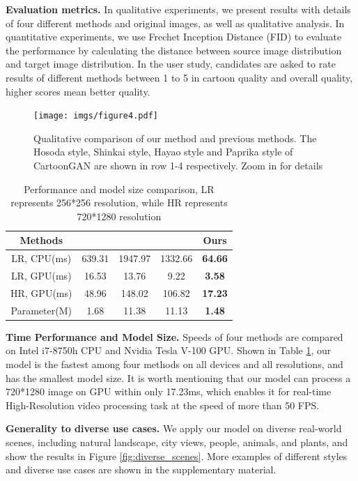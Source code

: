 \documentclass[10pt,twocolumn,letterpaper]{article}
\begin{document}
\textbf{Evaluation metrics.} In qualitative experiments, we present results with details of four different methods and original images, as well as qualitative analysis. In quantitative experiments, we use Frechet Inception Distance (FID) \cite{heusel2017gans} to evaluate the performance by calculating the distance between source image distribution and target image distribution. In the user study, candidates are asked to rate results of different methods between 1 to 5 in cartoon quality and overall quality, higher scores mean better quality.

\begin{figure}[htbp]
\centering
\texttt{[image: imgs/figure4.pdf]}
\caption{Qualitative comparison of our method and previous methods. The Hosoda style, Shinkai style,  Hayao style and Paprika style of CartoonGAN \cite{chen2018cartoongan} are shown in row 1-4 respectively. Zoom in for details}
\label{fig:comparison}
\end{figure}

\begin{table}[t]
\centering
\begin{tabular}{ccccc}
\hline
{Methods}&{\cite{johnson2016perceptual}}&{\cite{chen2018cartoongan}}&{\cite{CycleGAN2017}}&{Ours}\\
\hline  
{LR, CPU(ms)}&{639.31}&{1947.97}&{1332.66}&{\textbf{64.66}}\\
{LR, GPU(ms)}&{16.53}&{13.76}&{9.22}&{\textbf{3.58}}\\
{HR, GPU(ms)}&{48.96}&{148.02}&{106.82}&{\textbf{17.23}}\\
\hline 
{Parameter(M)}&{1.68}&{11.38}&{11.13}&{\textbf{1.48}}\\
\hline 
\end{tabular}
\caption{Performance and model size comparison, LR represents 256*256 resolution, while HR represents 720*1280 resolution}\label{table:speed}
\vspace{-1em}
\end{table}

\textbf{Time Performance and Model Size.} Speeds of four methods are compared on Intel i7-8750h CPU and Nvidia Tesla V-100 GPU. Shown in Table \ref{table:speed}, our model is the fastest among four methods on all devices and all resolutions, and has the smallest model size. It is worth mentioning that our model can process a 720*1280 image on GPU within only 17.23ms, which enables it for real-time High-Resolution video processing task at the speed of more than 50 FPS.

\textbf{Generality to diverse use cases.} We apply our model on diverse real-world scenes, including natural landscape, city views, people, animals, and plants, and show the results in Figure \ref{fig:diverse_scenes}. More examples of different styles and diverse use cases are shown in the supplementary material.
\end{document}

